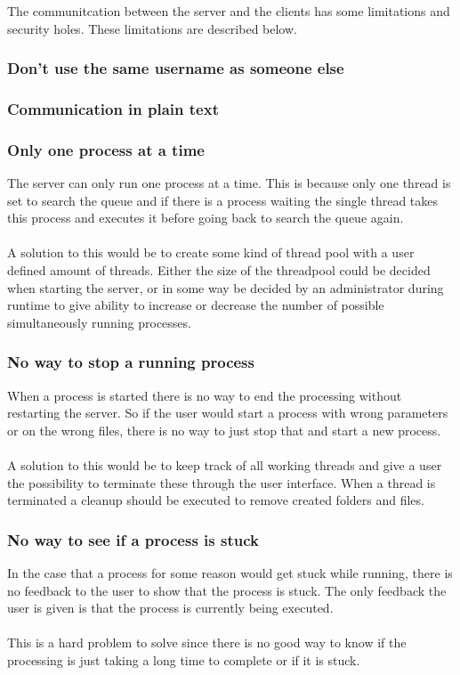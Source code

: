 The communitcation between the server and the clients has some limitations and security holes. These limitations are described below.
\subsubsection{Don't use the same username as someone else}

\subsubsection{Communication in plain text}

\subsubsection{Only one process at a time}
The server can only run one process at a time. This is because only one thread is set to search the queue and if there is a process waiting the single thread takes this process and executes it before going back to search the queue again.\\
\\
A solution to this would be to create some kind of thread pool with a user defined amount of threads. Either the size of the threadpool could be decided when starting the server, or in some way be decided by an administrator during runtime to give ability to increase or decrease the number of possible simultaneously running processes.
\subsubsection{No way to stop a running process}
When a process is started there is no way to end the processing without restarting the server. So if the user would start a process with wrong parameters or on the wrong files, there is no way to just stop that and start a new process.\\
\\
A solution to this would be to keep track of all working threads and give a user the possibility to terminate these through the user interface. When a thread is terminated a cleanup should be executed to remove created folders and files.
\subsubsection{No way to see if a process is stuck}
In the case that a process for some reason would get stuck while running, there is no feedback to the user to show that the process is stuck. The only feedback the user is given is that the process is currently being executed.\\
\\
This is a hard problem to solve since there is no good way to know if the processing is just taking a long time to complete or if it is stuck. 
